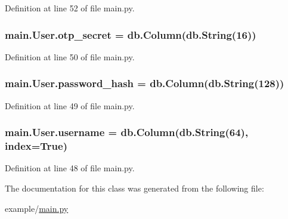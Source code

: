 Definition at line 52 of file main.\+py.

\subsubsection[{\texorpdfstring{otp\+\_\+secret}{otp_secret}}]{\setlength{\rightskip}{0pt plus 5cm}main.\+User.\+otp\+\_\+secret = db.\+Column(db.\+String(16))\hspace{0.3cm}{\ttfamily [static]}}\hypertarget{classmain_1_1User_a2a7a2d67099632b248ad93661e9733d2}{}\label{classmain_1_1User_a2a7a2d67099632b248ad93661e9733d2}


Definition at line 50 of file main.\+py.

\subsubsection[{\texorpdfstring{password\+\_\+hash}{password_hash}}]{\setlength{\rightskip}{0pt plus 5cm}main.\+User.\+password\+\_\+hash = db.\+Column(db.\+String(128))\hspace{0.3cm}{\ttfamily [static]}}\hypertarget{classmain_1_1User_a4bd5dd61d9eca670b326c87ec7f79f94}{}\label{classmain_1_1User_a4bd5dd61d9eca670b326c87ec7f79f94}


Definition at line 49 of file main.\+py.

\subsubsection[{\texorpdfstring{username}{username}}]{\setlength{\rightskip}{0pt plus 5cm}main.\+User.\+username = db.\+Column(db.\+String(64), {\bf index}=True)\hspace{0.3cm}{\ttfamily [static]}}\hypertarget{classmain_1_1User_afc469a49c408f90fb653d979d2669f62}{}\label{classmain_1_1User_afc469a49c408f90fb653d979d2669f62}


Definition at line 48 of file main.\+py.



The documentation for this class was generated from the following file\+:\begin{DoxyCompactItemize}
\item 
example/\hyperlink{main_8py}{main.\+py}\end{DoxyCompactItemize}

